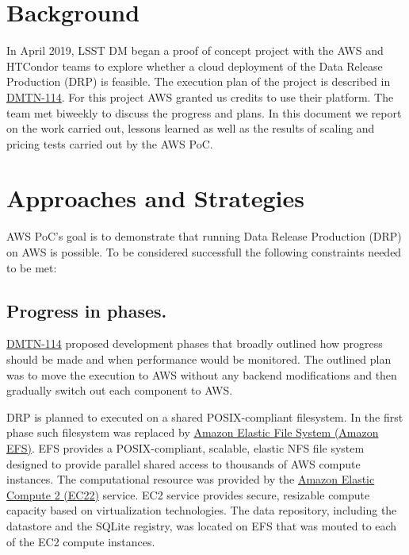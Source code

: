 \newcommand{\poc}{AWS PoC}
\newcommand{\dmtn}[1]{\href{https://dmtn-#1.lsst.io}{DMTN-#1}}





\section{Background}

In April 2019, LSST DM began a proof of concept project with the AWS and HTCondor teams to explore whether a cloud deployment of the Data Release Production (DRP) is feasible.
The execution plan of the project is described in \dmtn{114}.
For this project AWS granted us credits to use their platform.
The team met biweekly to discuss the progress and plans.
In this document we report on the work carried out, lessons learned as well as the results of scaling and pricing tests carried out by the \poc.


\section{Approaches and Strategies}

\poc's goal is to demonstrate that running Data Release Production (DRP) on AWS is possible. To be considered successfull the following constraints needed to be met:

\subsection{Progress in phases.}

\dmtn{114} proposed development phases that broadly outlined how progress should be made and when performance would be monitored. The outlined plan was to move the execution to AWS without any backend modifications and then gradually switch out each component to AWS.

DRP is planned to executed on a shared POSIX-compliant filesystem. In the first phase such filesystem was replaced by \href{https://aws.amazon.com/efs/}{Amazon Elastic File System (Amazon EFS)}. EFS provides a POSIX-compliant, scalable, elastic NFS file system designed to provide parallel shared access to thousands of AWS compute instances. The computational resource was provided by the \href{https://aws.amazon.com/ec2/}{Amazon Elastic Compute 2 (EC22)} service. EC2 service provides secure, resizable compute capacity based on virtualization technologies. The data repository, including the datastore and the SQLite registry, was located on EFS that was mouted to each of the EC2 compute instances.

